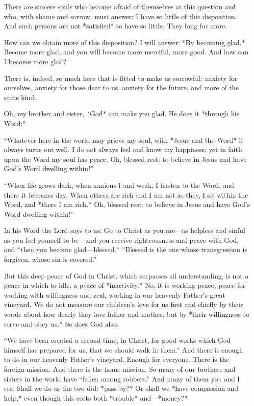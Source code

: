 There are sincere souls who become afraid of themselves at this question and who, with shame and sorrow, must answer: I have so little of this disposition. And such persons are not *satisfied* to have so little. They long for more.

How can we obtain more of this disposition? I will answer: *By becoming glad.* Become more glad, and you will become more merciful, more good. And how can I become more glad?

There is, indeed, so much here that is fitted to make us sorrowful: anxiety for ourselves, anxiety for those dear to us, anxiety for the future, and more of the same kind.

Oh, my brother and sister, *God* can make you glad. He does it *through his Word:*

“Whatever here in the world may grieve my soul,
with *Jesus and the Word* it always turns out well.
I do not always feel and know my happiness;
yet in faith upon the Word my soul has peace.
Oh, blessed rest:
to believe in Jesus
and have God’s Word dwelling within!”

“When life grows dark, when anxious I and weak,
I hasten to the Word, and there it becomes day.
When others are rich and I am not as they,
I sit within the Word, and *there I am rich.*
Oh, blessed rest:
to believe in Jesus
and have God’s Word dwelling within!”

In his Word the Lord says to us: Go to Christ as you are—as helpless and sinful as you feel yourself to be—and you receive righteousness and peace with God, and *then you become glad—blessed.* “Blessed is the one whose transgression is forgiven, whose sin is covered.”

But this deep peace of God in Christ, which surpasses all understanding, is not a peace in which to idle, a peace of *inactivity.* No, it is working peace, peace for working with willingness and zeal, working in our heavenly Father’s great vineyard. We do not measure our children’s love for us first and chiefly by their words about how dearly they love father and mother, but by *their willingness to serve and obey us.* So does God also.

“We have been created a second time, in Christ, for good works which God himself has prepared for us, that we should walk in them.” And there is enough to do in our heavenly Father’s vineyard. Enough for everyone. There is the foreign mission. And there is the home mission. So many of our brothers and sisters in the world have “fallen among robbers.” And many of them you and I see. Shall we do as the two did: *pass by?* Or shall we *have compassion and help,* even though this costs both *trouble* and—*money?*

